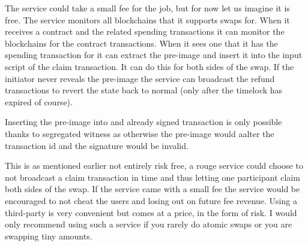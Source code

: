 The service could take a small fee for the job, but for now let us imagine it is free. The service monitors all blockchains that it supports swaps for. When it receives a contract and the related spending transactions it can monitor the blockchains for the contract transactions. When it sees one that it has the spending transaction for it can extract the pre-image and insert it into the input script of the claim transaction. It can do this for both sides of the swap. If the initiator never reveals the pre-image the service can broadcast the refund transactions to revert the state back to normal (only after the timelock has expired of course). 

Inserting the pre-image into and already signed transaction is only possible thanks to segregated witness as otherwise the pre-image would aalter the transaction id and the signature would be invalid. 

This is as mentioned earlier not entirely risk free, a rouge service could choose to not broadcast a claim transaction in time and thus letting one participant claim both sides of the swap. If the service came with a small fee the service would be encouraged to not cheat the users and losing out on future fee revenue. Using a third-party is very convenient but comes at a price, in the form of risk. I would only recommend using such a service if you rarely do atomic swaps or you are swapping tiny amounts.